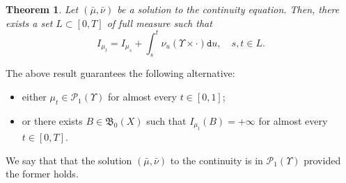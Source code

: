 \documentclass[10pt]{amsart}
\newtheorem{theorem}{Theorem}[section]
\theoremstyle{definition}
\theoremstyle{remark}
\begin{document}
\begin{theorem}\label{t:ce-intensity-measure}
Let $(\bar{\mu}, \bar{\nu})$ be a solution to the continuity equation.
Then, there exists a set $L \subset [0,T]$ of full measure such that
\begin{equation*}
I_{\mu_{t}} = I_{\mu_{s}} + \int_{s}^{t} \nu_{u}(\varUpsilon \times \cdot) \mathtt{d} u, \quad s, t\in L .
\end{equation*}
\end{theorem}
The above result guarantees the following alternative:
\begin{itemize}[wide]
\item either $\mu_{t} \in \mathscr{P}_{1}(\varUpsilon)$ for almost every $t \in [0,1]$;
\item or there exists $B \in \mathfrak{B}_{0}(X)$ such that $I_{\mu_{t}}(B) = + \infty$ for almost every $t \in [0,T]$.
\end{itemize}
We say that that the solution $(\bar{\mu}, \bar{\nu})$ to the continuity is in $\mathscr{P}_{1}(\varUpsilon)$ provided the former holds.
\end{document}
